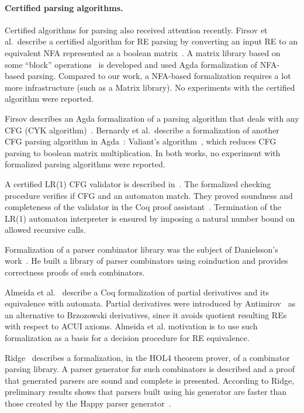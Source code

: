 \documentclass[sigconf]{acmart}
\theoremstyle{definition}
\begin{document}
\paragraph{Certified parsing algorithms.} Certified algorithms for
parsing also received attention recently. Firsov et al.~describe a
certified algorithm for RE parsing by converting an input RE to an
equivalent NFA represented as a boolean matrix~\cite{FirsovU13}. A
matrix library based on some ``block'' operations~\cite{MacedoO13} is
developed and used Agda formalization of NFA-based parsing. Compared 
to our work, a NFA-based formalization requires
a lot more infrastructure (such as a Matrix library). No experiments
with the certified algorithm were reported.

Firsov describes an Agda formalization of a parsing algorithm that
deals with any CFG (CYK algorithm)~\cite{Firsov2014}. Bernardy
et al.~describe a formalization of another CFG parsing algorithm in
Agda~\cite{BernardyJ16}: Valiant's algorithm~\cite{Valiant1975}, which
reduces CFG parsing to boolean matrix multiplication. In both works,
no experiment with formalized parsing algorithms were reported.

A certified LR(1) CFG validator is described
in~\cite{Jourdan2012}. The formalized checking procedure verifies if
CFG and an automaton match. They proved soundness and completeness of
the validator in the Coq proof
assistant~\cite{Bertot2010}. Termination of the LR(1) automaton
interpreter is ensured by imposing a natural number bound on
allowed recursive calls.

Formalization of a parser combinator library was the subject of
Danielsson's work~\cite{Danielsson2010}. He built a library of parser
combinators using coinduction and provides correctness proofs of such
combinators.

Almeida et al.~\cite{AlmeidaMPS10} describe a Coq formalization of
partial derivatives and its equivalence with automata. Partial
derivatives were introduced by Antimirov~\cite{Antimirov91} as an
alternative to Brzozowski derivatives, since it avoids quotient
resulting REs with respect to ACUI axioms. Almeida et al. motivation
is to use such formalization as a basis for a decision procedure for
RE equivalence.

Ridge~\cite{Ridge2011} describes a formalization, in the HOL4 theorem
prover, of a combinator parsing library. A parser generator for such
combinators is described and a proof that generated parsers are sound
and complete is presented.  According to Ridge, preliminary results
shows that parsers built using his generator are faster than those
created by the Happy parser generator~\cite{Happy}.
\end{document}
